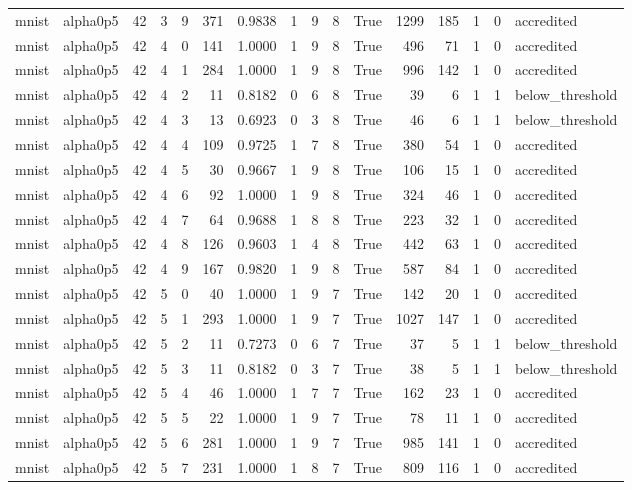 \begin{tabular}{llrrrrrrrrrrrrrl}
mnist & alpha0p5 & 42 & 3 & 9 & 371 & 0.9838 & 1 & 9 & 8 & True & 1299 & 185 & 1 & 0 & accredited \\
mnist & alpha0p5 & 42 & 4 & 0 & 141 & 1.0000 & 1 & 9 & 8 & True & 496 & 71 & 1 & 0 & accredited \\
mnist & alpha0p5 & 42 & 4 & 1 & 284 & 1.0000 & 1 & 9 & 8 & True & 996 & 142 & 1 & 0 & accredited \\
mnist & alpha0p5 & 42 & 4 & 2 & 11 & 0.8182 & 0 & 6 & 8 & True & 39 & 6 & 1 & 1 & below\_threshold \\
mnist & alpha0p5 & 42 & 4 & 3 & 13 & 0.6923 & 0 & 3 & 8 & True & 46 & 6 & 1 & 1 & below\_threshold \\
mnist & alpha0p5 & 42 & 4 & 4 & 109 & 0.9725 & 1 & 7 & 8 & True & 380 & 54 & 1 & 0 & accredited \\
mnist & alpha0p5 & 42 & 4 & 5 & 30 & 0.9667 & 1 & 9 & 8 & True & 106 & 15 & 1 & 0 & accredited \\
mnist & alpha0p5 & 42 & 4 & 6 & 92 & 1.0000 & 1 & 9 & 8 & True & 324 & 46 & 1 & 0 & accredited \\
mnist & alpha0p5 & 42 & 4 & 7 & 64 & 0.9688 & 1 & 8 & 8 & True & 223 & 32 & 1 & 0 & accredited \\
mnist & alpha0p5 & 42 & 4 & 8 & 126 & 0.9603 & 1 & 4 & 8 & True & 442 & 63 & 1 & 0 & accredited \\
mnist & alpha0p5 & 42 & 4 & 9 & 167 & 0.9820 & 1 & 9 & 8 & True & 587 & 84 & 1 & 0 & accredited \\
mnist & alpha0p5 & 42 & 5 & 0 & 40 & 1.0000 & 1 & 9 & 7 & True & 142 & 20 & 1 & 0 & accredited \\
mnist & alpha0p5 & 42 & 5 & 1 & 293 & 1.0000 & 1 & 9 & 7 & True & 1027 & 147 & 1 & 0 & accredited \\
mnist & alpha0p5 & 42 & 5 & 2 & 11 & 0.7273 & 0 & 6 & 7 & True & 37 & 5 & 1 & 1 & below\_threshold \\
mnist & alpha0p5 & 42 & 5 & 3 & 11 & 0.8182 & 0 & 3 & 7 & True & 38 & 5 & 1 & 1 & below\_threshold \\
mnist & alpha0p5 & 42 & 5 & 4 & 46 & 1.0000 & 1 & 7 & 7 & True & 162 & 23 & 1 & 0 & accredited \\
mnist & alpha0p5 & 42 & 5 & 5 & 22 & 1.0000 & 1 & 9 & 7 & True & 78 & 11 & 1 & 0 & accredited \\
mnist & alpha0p5 & 42 & 5 & 6 & 281 & 1.0000 & 1 & 9 & 7 & True & 985 & 141 & 1 & 0 & accredited \\
mnist & alpha0p5 & 42 & 5 & 7 & 231 & 1.0000 & 1 & 8 & 7 & True & 809 & 116 & 1 & 0 & accredited \\

\end{tabular}
